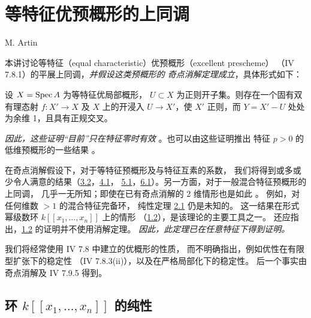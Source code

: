 \chapter{等特征优预概形的上同调}
\begin{center}
M. Artin
\end{center}
\label{sga4.exp.XIX}

\renewcommand{\sisi}[2]{#2}

\newcommand{\UU}{\mathbf{U}}

本\pageoriginale 讲讨论等特征（equal characteristic）优预概形（excellent prescheme）
（\EGA IV 7.8.1）的平展上同调，\emph{并假设这类预概形的
奇点消解\pageoriginale 定理成立}，具体形式如下：

设 $X=\operatorname{Spec} A$ 为等特征优局部概形，
$U\subset X$ 为正则开子集。则存在一个固有双有理态射
$f:X'\rightarrow X$ 及 $X$ 上的开浸入
$U\rightarrow X'$，使 $X'$ 正则，而
$Y=X'-U$ 处处为余维 1，且具有正规交叉。

\emph{因此，这些证明“目前”只在特征零时有效}
\cite{sga4.exp.XIX.bib.4}。也可以由这些证明推出
特征 $p>0$ 的低维预概形的一些结果
\cite{sga4.exp.XIX.bib.1}。

在奇点消解假设下，对于等特征预概形及与特征互素的系数，
我们将得到或多或少令人满意的结果（\cf \hyperref[XIX.thm3.2]{3.2}，\hyperref[XIX.thm4.1]{4.1}，
\hyperref[XIX.thm5.1]{5.1}，\hyperref[XIX.thm6.1]{6.1}）。另一方面，对于一般混合特征预概形的上同调，
几乎一无所知；即使在已有奇点消解的
2 维情形也是如此 \cite{sga4.exp.XIX.bib.2}。
例如，对任何维数 $>1$ 的混合特征完备环，
纯性定理 \hyperref[XIX.thm2.1]{2.1} 仍是未知的。
这一结果在形式幂级数环 $k[[x_{1},\ldots, x_{n}]]$ 上的情形
（\hyperref[XIX.thm1.2]{1.2}），是该理论的主要工具之一。
还应指出，\hyperref[XIX.thm1.2]{1.2} 的证明并不使用消解定理。
\emph{因此，此定理已在任意特征下得到证明。}

我们将经常使用 \EGA IV 7.8 中建立的优\pageoriginale 概形的性质，
而不明确指出，例如优性在有限型扩张下的稳定性
（\EGA IV 7.8.3(ii)），以及在严格局部化下的稳定性。
后一个事实由奇点消解及 \EGA IV 7.9.5 得到。

\section{环 $k[[x_{1},\ldots,x_{n}]]$ 的纯性}

